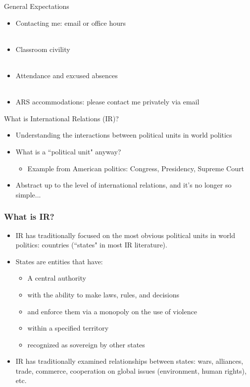 \documentclass[handout]{beamer}
\begin{document}
\begin{frame}{\LARGE General Expectations}
	\begin{itemize}
		\item Contacting me: email or office hours
		\\~\\
		\item Classroom civility
		\\~\\
		\item Attendance and excused absences
		\\~\\
		\item ARS accommodations: please contact me privately via email
	\end{itemize}
\end{frame}

\begin{frame}{\LARGE What is International Relations (IR)?}
    \begin{itemize}
        \item Understanding the interactions between political units in world politics 
        \item What is a ``political unit" anyway? \pause
        \begin{itemize}
        \item Example from American politics: Congress, Presidency, Supreme Court
   		\end{itemize}
        \item Abstract up to the level of international relations, and it's no longer so simple...
    \end{itemize}
\end{frame}

\begin{frame}
\frametitle{\LARGE{What is IR?}}
\begin{itemize}
	\item IR has traditionally focused on the most obvious political units in world politics: countries (``states" in most IR literature).
	\item States are entities that have:
	\begin{itemize}
		\item A central authority \pause
		\item with the ability to make laws, rules, and decisions \pause
		\item and enforce them via a monopoly on the use of violence \pause
		\item within a specified territory \pause
		\item recognized as sovereign by other states \pause
	\end{itemize}
	\item IR has traditionally examined relationships between states: wars, alliances, trade, commerce, cooperation on global issues (environment, human rights), etc.
\end{itemize}
\end{frame}
\end{document}
